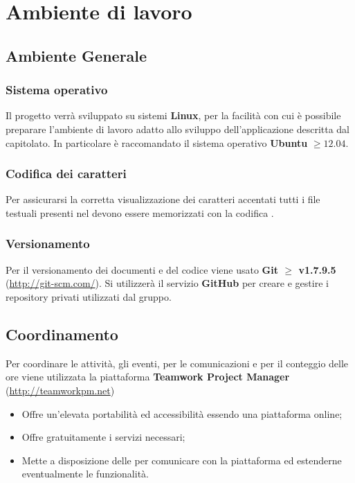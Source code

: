\section{Ambiente di lavoro}
	
	\subsection{Ambiente Generale}
		
		\subsubsection{Sistema operativo}
		
		Il progetto verrà sviluppato su sistemi \textbf{Linux}, per la facilità con cui è possibile preparare l'ambiente di lavoro adatto allo sviluppo dell'applicazione descritta dal capitolato. In particolare è raccomandato il sistema operativo \textbf{Ubuntu} $\geq 12.04$.
		
		\subsubsection{Codifica dei caratteri}
		
		Per assicurarsi la corretta visualizzazione dei caratteri accentati tutti i file testuali presenti nel  devono essere memorizzati con la codifica \textbf{}.
		
		\subsubsection{Versionamento}
		\label{github}
		
		Per il versionamento dei documenti e del codice viene usato \textbf{Git $\ge$ v1.7.9.5} (\url{http://git-scm.com/}).
		Si utilizzerà il servizio \textbf{GitHub} per creare e gestire i repository privati utilizzati dal gruppo.
		
	\subsection{Coordinamento}
	\label{teamworkpm}
	
		Per coordinare le attività, gli eventi, per le comunicazioni e per il conteggio delle ore viene utilizzata la piattaforma \textbf{Teamwork Project Manager} (\url{http://teamworkpm.net})
		\begin{itemize}
			\item Offre un'elevata portabilità ed accessibilità essendo una piattaforma online;
			\item Offre gratuitamente i servizi necessari;
			\item Mette a disposizione delle  per comunicare con la piattaforma ed estenderne eventualmente le funzionalità.
		\end{itemize}
		

